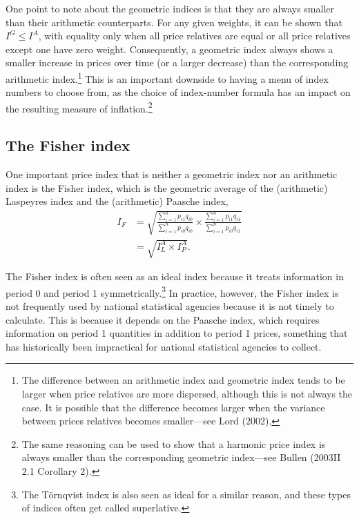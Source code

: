 \documentclass[
]{article}
\begin{document}
One point to note about the geometric indices is that they are always smaller than their arithmetic counterparts. For any given weights, it can be shown that \(I^{G} \leq I^{A}\), with equality only when all price relatives are equal or all price relatives except one have zero weight. Consequently, a geometric index always shows a smaller increase in prices over time (or a larger decrease) than the corresponding arithmetic index.\footnote{The difference between an arithmetic index and geometric index tends to be larger when price relatives are more dispersed, although this is not always the case. It is possible that the difference becomes larger when the variance between prices relatives becomes smaller---see Lord (2002).} This is an important downside to having a menu of index numbers to choose from, as the choice of index-number formula has an impact on the resulting measure of inflation.\footnote{The same reasoning can be used to show that a harmonic price index is always smaller than the corresponding geometric index---see Bullen (2003II 2.1 Corollary 2).}

\hypertarget{the-fisher-index}{%
\subsection{The Fisher index}\label{the-fisher-index}}

One important price index that is neither a geometric index nor an arithmetic index is the Fisher index, which is the geometric average of the (arithmetic) Laspeyres index and the (arithmetic) Paasche index,
\begin{align*}
I_{F} &= \sqrt{\frac{\sum_{i = 1}^{n} p_{i1} q_{i0}}{\sum_{i = 1}^{n} p_{i0} q_{i0}} \times \frac{\sum_{i = 1}^{n} p_{i1} q_{i1}}{\sum_{i = 1}^{n} p_{i0} q_{i1}}} \\
&= \sqrt{I^{A}_{L} \times I^{A}_{P}}.
\end{align*}

The Fisher index is often seen as an ideal index because it treats information in period 0 and period 1 symmetrically.\footnote{The Törnqvist index is also seen as ideal for a similar reason, and these types of indices often get called superlative.} In practice, however, the Fisher index is not frequently used by national statistical agencies because it is not timely to calculate. This is because it depends on the Paasche index, which requires information on period 1 quantities in addition to period 1 prices, something that has historically been impractical for national statistical agencies to collect.
\end{document}
